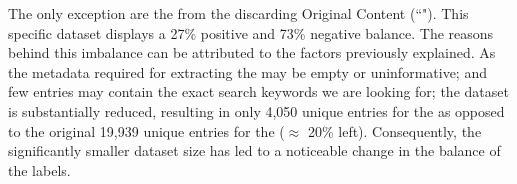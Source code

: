 


The only exception are the \keyphrases{} from the \trafilaturaAbstract{} discarding Original Content (``\keyphrasesAbstractOnly{}"). This specific dataset displays a 27\% positive and 73\% negative balance. The reasons behind this imbalance can be attributed to the factors previously explained. As the metadata required for extracting the \trafilaturaAbstract{} may be empty or uninformative; and few entries may contain the exact search keywords we are looking for; the dataset is substantially reduced, resulting in only 4,050 unique entries for the \keyphrasesAbstractOnly{}  as opposed to the original 19,939  unique entries for the \trafilaturaAbstract{} ($\approx$ 20\% left). Consequently, the significantly smaller dataset size has led to a noticeable change in the balance of the labels.


